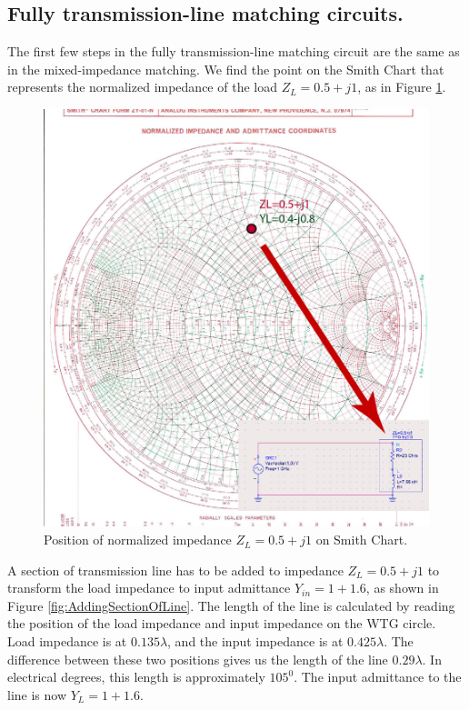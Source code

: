 \documentclass{ximera}
\begin{document}
\newpage


\subsection{Fully transmission-line matching circuits.}

The first few steps in the fully transmission-line matching circuit are the same as in the mixed-impedance matching. We find the point on the Smith Chart that represents the normalized impedance of the load $Z_L=0.5+j1$, as in Figure \ref{fig:NormImponSC}. 

\begin{figure}[htbp]
\begin{center}
\includegraphics[scale=1]{../jpg/MixedMatch2-01.jpg}
\end{center}
\caption{Position of normalized impedance $Z_L=0.5+j1$ on Smith Chart.}
\label{fig:NormImponSC}
\end{figure}

A section of transmission line has to be added to impedance $Z_L=0.5+j1$ to transform the load impedance to input admittance $Y_{in}=1+1.6$, as shown in Figure \ref{fig:AddingSectionOfLine}. The length of the line is calculated by reading the position of the load impedance and input impedance on the WTG circle. Load impedance is at $0.135 \lambda$, and the input impedance is at $0.425 \lambda$. The difference between these two positions gives us the length of the line $0.29 \lambda$. In electrical degrees, this length is approximately $105^0$. The input admittance to the line is now $Y_L=1+1.6$. 
\end{document}
